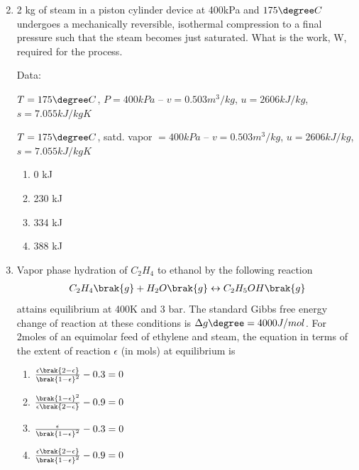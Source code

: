 \documentclass[journal,12pt,onecolumn]{IEEEtran}
\theoremstyle{remark}
\begin{document}
\begin{enumerate}
\begin{multicols}{2}
\begin{enumerate}
    \end{enumerate}
\end{multicols}

    \item 2 kg of steam in a piston cylinder device at 400kPa and $175\degree C$ undergoes a mechanically reversible, isothermal compression to a final pressure such that the steam becomes just saturated. What is the work, W, required for the process.

    Data:

    $T=175\degree C$, $P = 400 kPa$ -- $v = 0.503 m^3/kg$, $u=2606kJ/kg$, $s=7.055 kJ/kgK$

    $T=175\degree C$, satd. vapor $= 400 kPa$ -- $v = 0.503 m^3/kg$, $u=2606kJ/kg$, $s=7.055 kJ/kgK$

\begin{multicols}{4}
    \begin{enumerate}
        \item 0 kJ
        \item 230 kJ
        \item 334 kJ
        \item 388 kJ
    \end{enumerate}
\end{multicols}

    \item Vapor phase hydration of  $C_2H_4$ to ethanol by the following reaction 
    \begin{align*}
    C_2H_4\brak{g}+H_2O\brak{g} \leftrightarrow C_2H_5OH\brak{g}
     \end{align*}
attains equilibrium at 400K and 3 bar. The standard Gibbs free energy change of reaction at these conditions is $\Delta g\degree = 4000J/mol$. For 2moles of an equimolar feed of ethylene and steam, the equation in terms of the extent of reaction $\epsilon$ (in mols) at equilibrium is 

\begin{multicols}{2}
    \begin{enumerate}
        \item $\frac{\epsilon \brak{2-\epsilon}}{\brak{1 - \epsilon}^2} - 0.3 =0$
        \item $\frac{\brak{1-\epsilon}^2}{\epsilon \brak{2 - \epsilon}} - 0.9 =0$
        \item $\frac{\epsilon}{\brak{1 - \epsilon}^2} - 0.3 =0$
        \item $\frac{\epsilon \brak{2-\epsilon}}{\brak{1 - \epsilon}^2} - 0.9 =0$
    \end{enumerate}
\end{multicols}


\end{enumerate}
\end{document}
